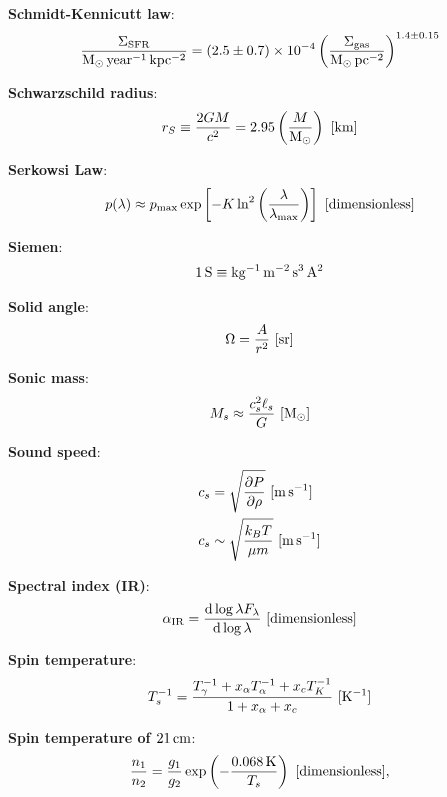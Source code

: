 \documentclass[a4paper,10pt]{article}
\begin{document}
{\noindent}\textbf{Schmidt-Kennicutt law}:
\begin{align*}
    \frac{\Sigma_\mathrm{SFR}}{{\rm M_\odot\,year^{-1}\,kpc^{-2}}} = (2.5\pm0.7)\times10^{-4} \left(\frac{\Sigma_\mathrm{gas}}{{\rm M_\odot\,pc^{-2}}}\right)^{1.4\pm0.15}
\end{align*}

{\noindent}\textbf{Schwarzschild radius}:
\begin{align*}
    r_S \equiv \frac{2GM}{c^2} = 2.95\left(\frac{M}{{\rm M_\odot}}\right) ~ [{\rm km}]
\end{align*}

{\noindent}\textbf{Serkowsi Law}:
\begin{align*}
    p(\lambda) \approx p_\mathrm{max}\exp \left[-K\ln^2\left(\frac{\lambda}{\lambda_\mathrm{max}}\right)\right] ~ [{\rm dimensionless}]
\end{align*}

{\noindent}\textbf{Siemen}:
\begin{align*}
    {\rm 1\,S \equiv kg^{-1}\,m^{-2}\,s^3\,A^2}
\end{align*}

{\noindent}\textbf{Solid angle}:
\begin{align*}
    \Omega = \frac{A}{r^2} ~ [{\rm sr}]
\end{align*}

{\noindent}\textbf{Sonic mass}:
\begin{align*}
    M_s \approx \frac{c_s^2\ell_s}{G} ~ [{\rm M_\odot}]
\end{align*}

{\noindent}\textbf{Sound speed}:
\begin{align*}
    c_s &= \sqrt{\frac{\partial P}{\partial\rho}} ~ [{\rm m\,s^{-1}}] \\
    c_s &\sim \sqrt{\frac{k_BT}{\mu m}} ~ [{\rm m\,s^{-1}}]
\end{align*}

{\noindent}\textbf{Spectral index (IR)}:
\begin{align*}
    \alpha_{\rm IR} = \frac{{\rm d}\log\lambda F_\lambda}{{\rm d}\log \lambda} ~ [{\rm dimensionless}]
\end{align*}

{\noindent}\textbf{Spin temperature}:
\begin{align*}
    T_s^{-1} = \frac{T_\gamma^{-1} + x_\alpha T_\alpha^{-1} + x_cT_K^{-1}}{1+x_\alpha+x_c} ~ [{\rm K^{-1}}]
\end{align*}

{\noindent}\textbf{Spin temperature of $21\,{\rm cm}$}:
\begin{align*}
    \frac{n_1}{n_2} = \frac{g_1}{g_2}\exp\left(-\frac{0.068\,{\rm K}}{T_s}\right) ~ [{\rm dimensionless}],
\end{align*}
\end{document}
